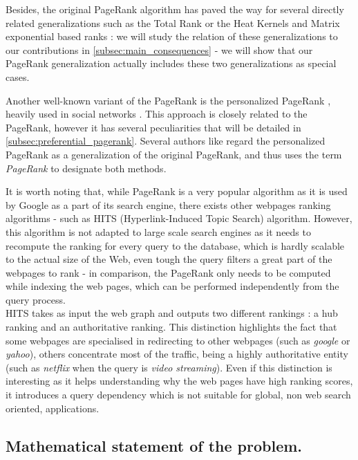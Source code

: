 \documentclass{article}
\begin{document}
Besides, the original PageRank algorithm has paved the way for several directly related generalizations such as the Total Rank \cite{boldi_2005} or the Heat Kernels and Matrix exponential based ranks \cite{yang_king_lyu_2007}: we will study the relation of these generalizations to our contributions in \ref{subsec:main_consequences} - we will show that our PageRank generalization actually includes these two generalizations as special cases.

Another well-known variant of the PageRank is the personalized PageRank \cite{haveliwala_2003, langville_meyer_2004, gleich_2015}, heavily used in social networks \cite{gleich_2015}. This approach is closely related to the PageRank, however it has several peculiarities that will be detailed in \ref{subsec:preferential_pagerank}. Several authors like \cite{gleich_2015} regard the personalized PageRank as a generalization of the original PageRank, and thus uses the term \textit{PageRank} to designate both methods. 

It is worth noting that, while PageRank is a very popular algorithm as it is used by Google as a part of its search engine, there exists other webpages ranking algorithms - such as HITS (Hyperlink-Induced Topic Search) \cite{kleinberg_hubs, kleinberg_1999} algorithm. However, this algorithm is not adapted to large scale search engines as it needs to recompute the ranking for every query to the database, which is hardly scalable to the actual size of the Web, even tough the query filters a great part of the webpages to rank - in comparison, the PageRank only needs to be computed while indexing the web pages, which can be performed independently from the query process.\\
HITS takes as input the web graph and outputs two different rankings : a hub ranking and an authoritative ranking. This distinction highlights the fact that some webpages are specialised in redirecting to other webpages (such as \textit{google} or \textit{yahoo}), others concentrate most of the traffic, being a highly authoritative entity (such as \textit{netflix} when the query is \textit{video streaming}). Even if this distinction is interesting as it helps understanding why the web pages have high ranking scores, it introduces a query dependency which is not suitable for global, non web search oriented, applications.


\subsection{Mathematical statement of the problem.}
\end{document}
